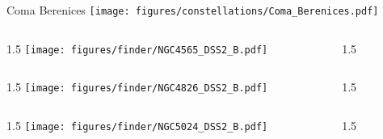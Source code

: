 \documentclass[final]{beamer}
\newlength{\colwidth}
\begin{document}

\begin{frame}[t]{\LARGE Coma Berenices}
  \centering
  \texttt{[image: figures/constellations/Coma\_Berenices.pdf]}
\end{frame}


\begin{frame}[t]{}
  \begin{columns}[T]
    \begin{column}{1.5\colwidth}
      \centering
      \texttt{[image: figures/finder/NGC4565\_DSS2\_B.pdf]}
    \end{column}
    \begin{column}{1.5\colwidth}
      \Large
      
    \end{column}
  \end{columns}
  \vspace{\fill}
  \begin{columns}[T]
    \begin{column}{1.5\colwidth}
      \centering
      \texttt{[image: figures/finder/NGC4826\_DSS2\_B.pdf]}
    \end{column}
    \begin{column}{1.5\colwidth}
      \Large
      
    \end{column}
  \end{columns}
\end{frame}


\begin{frame}[t]{}
  \begin{columns}[T]
    \begin{column}{1.5\colwidth}
      \centering
      \texttt{[image: figures/finder/NGC5024\_DSS2\_B.pdf]}
    \end{column}
    \begin{column}{1.5\colwidth}
      \Large
      
    \end{column}
  \end{columns}
  \vspace{\fill}
\end{frame}
\end{document}

